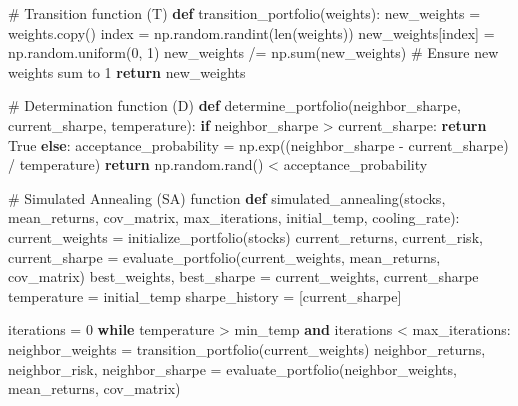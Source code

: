 \documentclass[
  letterpaper,
  DIV=11,
  numbers=noendperiod]{scrreprt}
\newenvironment{Shaded}{\begin{snugshade}}{\end{snugshade}}
\newcommand{\BuiltInTok}[1]{\textcolor[rgb]{0.00,0.23,0.31}{#1}}
\newcommand{\CommentTok}[1]{\textcolor[rgb]{0.37,0.37,0.37}{#1}}
\newcommand{\ControlFlowTok}[1]{\textcolor[rgb]{0.00,0.23,0.31}{\textbf{#1}}}
\newcommand{\DecValTok}[1]{\textcolor[rgb]{0.68,0.00,0.00}{#1}}
\newcommand{\KeywordTok}[1]{\textcolor[rgb]{0.00,0.23,0.31}{\textbf{#1}}}
\newcommand{\NormalTok}[1]{\textcolor[rgb]{0.00,0.23,0.31}{#1}}
\newcommand{\OperatorTok}[1]{\textcolor[rgb]{0.37,0.37,0.37}{#1}}
\newcommand{\VariableTok}[1]{\textcolor[rgb]{0.07,0.07,0.07}{#1}}
\begin{document}
\begin{Shaded}
\begin{Highlighting}[]
\CommentTok{\# Transition function (T)}
\KeywordTok{def}\NormalTok{ transition\_portfolio(weights):}
\NormalTok{    new\_weights }\OperatorTok{=}\NormalTok{ weights.copy()}
\NormalTok{    index }\OperatorTok{=}\NormalTok{ np.random.randint(}\BuiltInTok{len}\NormalTok{(weights))}
\NormalTok{    new\_weights[index] }\OperatorTok{=}\NormalTok{ np.random.uniform(}\DecValTok{0}\NormalTok{, }\DecValTok{1}\NormalTok{)}
\NormalTok{    new\_weights }\OperatorTok{/=}\NormalTok{ np.}\BuiltInTok{sum}\NormalTok{(new\_weights)  }\CommentTok{\# Ensure new weights sum to 1}
    \ControlFlowTok{return}\NormalTok{ new\_weights}

\CommentTok{\# Determination function (D)}
\KeywordTok{def}\NormalTok{ determine\_portfolio(neighbor\_sharpe, current\_sharpe, temperature):}
    \ControlFlowTok{if}\NormalTok{ neighbor\_sharpe }\OperatorTok{\textgreater{}}\NormalTok{ current\_sharpe:}
        \ControlFlowTok{return} \VariableTok{True}
    \ControlFlowTok{else}\NormalTok{:}
\NormalTok{        acceptance\_probability }\OperatorTok{=}\NormalTok{ np.exp((neighbor\_sharpe }\OperatorTok{{-}}\NormalTok{ current\_sharpe) }\OperatorTok{/}\NormalTok{ temperature)}
        \ControlFlowTok{return}\NormalTok{ np.random.rand() }\OperatorTok{\textless{}}\NormalTok{ acceptance\_probability}

\CommentTok{\# Simulated Annealing (SA) function}
\KeywordTok{def}\NormalTok{ simulated\_annealing(stocks, mean\_returns, cov\_matrix, max\_iterations, initial\_temp, cooling\_rate):}
\NormalTok{    current\_weights }\OperatorTok{=}\NormalTok{ initialize\_portfolio(stocks)}
\NormalTok{    current\_returns, current\_risk, current\_sharpe }\OperatorTok{=}\NormalTok{ evaluate\_portfolio(current\_weights, mean\_returns, cov\_matrix)}
\NormalTok{    best\_weights, best\_sharpe }\OperatorTok{=}\NormalTok{ current\_weights, current\_sharpe}
\NormalTok{    temperature }\OperatorTok{=}\NormalTok{ initial\_temp}
\NormalTok{    sharpe\_history }\OperatorTok{=}\NormalTok{ [current\_sharpe]}

\NormalTok{    iterations }\OperatorTok{=} \DecValTok{0}
    \ControlFlowTok{while}\NormalTok{ temperature }\OperatorTok{\textgreater{}}\NormalTok{ min\_temp }\KeywordTok{and}\NormalTok{ iterations }\OperatorTok{\textless{}}\NormalTok{ max\_iterations:}
\NormalTok{        neighbor\_weights }\OperatorTok{=}\NormalTok{ transition\_portfolio(current\_weights)}
\NormalTok{        neighbor\_returns, neighbor\_risk, neighbor\_sharpe }\OperatorTok{=}\NormalTok{ evaluate\_portfolio(neighbor\_weights, mean\_returns, cov\_matrix)}


\end{Highlighting}
\end{Shaded}
\end{document}

